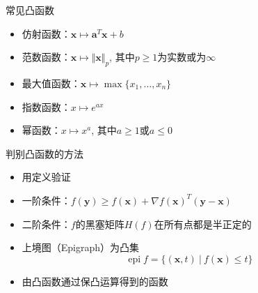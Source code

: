 
\begin{frame}

\begin{block}{常见凸函数}
\begin{itemize}
\item 仿射函数：$\mathbf{x} \mapsto \mathbf{a}^T\mathbf{x} + b$
\item 范数函数：$\mathbf{x} \mapsto \Vert \mathbf{x} \Vert_p$, 其中$p\ge1$为实数或为$\infty$
\item 最大值函数：$\mathbf{x} \mapsto \max\{x_1,\ldots,x_n\}$
\item 指数函数：$x \mapsto e^{ax}$
\item 幂函数：$x \mapsto x^{a}$, 其中$a \ge 1$或$a\le 0$
\end{itemize}
\end{block}

\end{frame}


\begin{frame}

\begin{block}{判别凸函数的方法}
\begin{itemize}
\item 用定义验证
\item 一阶条件：$f(\mathbf{y}) \ge f(\mathbf{x}) + \nabla f(\mathbf{x})^T(\mathbf{y} - \mathbf{x})$
\item 二阶条件：$f$的黑塞矩阵$H(f)$在所有点都是半正定的
\item 上境图（Epigraph）为凸集
\[\operatorname{epi}f = \{ (\mathbf{x}, t) \ |\ f(\mathbf{x}) \le t \}\]
\item 由凸函数通过保凸运算得到的函数
\end{itemize}
\end{block}

\end{frame}


